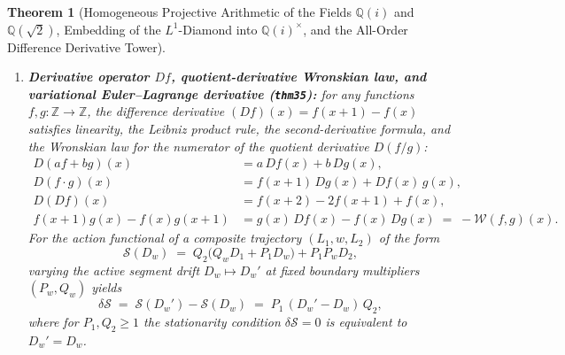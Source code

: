 \documentclass[11pt,a4paper]{article}
\theoremstyle{plain}
\newtheorem{theorem}{Theorem}[section]
\theoremstyle{definition}
\begin{document}
\begin{theorem}[Homogeneous Projective Arithmetic of the Fields $\mathbb{Q}(i)$ and $\mathbb{Q}(\sqrt{2})$, Embedding of the $L^1$-Diamond into $\mathbb{Q}(i)^\times$, and the All-Order Difference Derivative Tower]
\begin{enumerate}[label=\textbf{(\roman*)},leftmargin=*]
\item \textbf{Derivative operator $Df$, quotient-derivative Wronskian law, and variational Euler--Lagrange derivative (\texttt{thm35}):}
  for any functions $f, g\colon \mathbb{Z} \to \mathbb{Z}$, the difference derivative $(Df)(x) = f(x+1) - f(x)$ satisfies linearity, the Leibniz product rule, the second-derivative formula, and the Wronskian law for the numerator of the quotient derivative $D(f/g)$:
  \begin{align}
    D(af + bg)(x) &= a\,Df(x) + b\,Dg(x), \label{eq:deriv-lin} \\
    D(f\cdot g)(x) &= f(x+1)\,Dg(x) + Df(x)\,g(x), \label{eq:deriv-leibniz} \\
    D(Df)(x) &= f(x+2) - 2f(x+1) + f(x), \label{eq:deriv-second} \\
    f(x+1)g(x) - f(x)g(x+1) &= g(x)\,Df(x) - f(x)\,Dg(x) \;=\; -\mathcal{W}(f, g)(x). \label{eq:deriv-quotient-wronskian}
  \end{align}
  For the action functional of a composite trajectory $(L_1, w, L_2)$ of the form
  \begin{equation}
    \label{eq:cascade-action-def}
    \mathcal{S}(D_w) \;=\; Q_2\bigl(Q_w D_1 + P_1 D_w\bigr) + P_1 P_w D_2,
  \end{equation}
  varying the active segment drift $D_w \mapsto D_w'$ at fixed boundary multipliers $(P_w, Q_w)$ yields
  \begin{equation}
    \label{eq:variational-euler-lagrange}
    \delta\mathcal{S} \;=\; \mathcal{S}(D_w') - \mathcal{S}(D_w) \;=\; P_1\,(D_w' - D_w)\,Q_2,
  \end{equation}
  where for $P_1, Q_2 \ge 1$ the stationarity condition $\delta\mathcal{S} = 0$ is equivalent to $D_w' = D_w$.


\end{enumerate}
\end{theorem}
\end{document}
